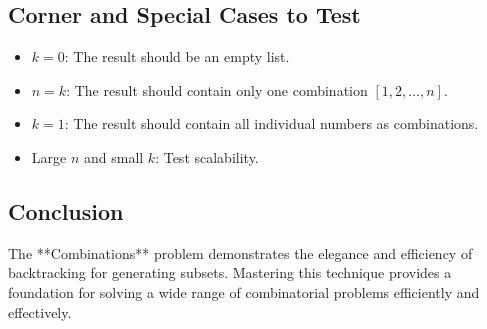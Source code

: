 \subsection*{Corner and Special Cases to Test}
\begin{itemize}
    \item \( k = 0 \): The result should be an empty list.
    \item \( n = k \): The result should contain only one combination \([1, 2, \ldots, n]\).
    \item \( k = 1 \): The result should contain all individual numbers as combinations.
    \item Large \( n \) and small \( k \): Test scalability.
\end{itemize}

\subsection*{Conclusion}
The **Combinations** problem demonstrates the elegance and efficiency of backtracking for generating subsets. Mastering this technique provides a foundation for solving a wide range of combinatorial problems efficiently and effectively.